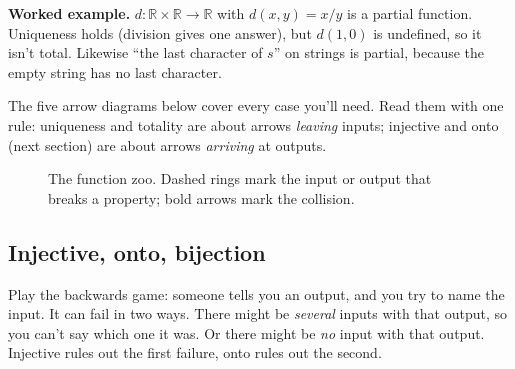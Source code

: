 \textbf{Worked example.} $d:\mathbb{R}\times\mathbb{R}\to\mathbb{R}$ with $d(x,y)=x/y$ is a partial function. Uniqueness holds (division gives one answer), but $d(1,0)$ is undefined, so it isn't total. Likewise ``the last character of $s$'' on strings is partial, because the empty string has no last character.

The five arrow diagrams below cover every case you'll need. Read them with one rule: uniqueness and totality are about arrows \emph{leaving} inputs; injective and onto (next section) are about arrows \emph{arriving} at outputs.

\begin{figure}[H]
\centering
{}
\caption{The function zoo. Dashed rings mark the input or output that breaks a property; bold arrows mark the collision.}
\end{figure}

\subsection{Injective, onto, bijection}

Play the backwards game: someone tells you an output, and you try to name the input. It can fail in two ways. There might be \emph{several} inputs with that output, so you can't say which one it was. Or there might be \emph{no} input with that output. Injective rules out the first failure, onto rules out the second.

